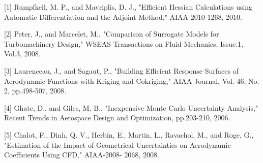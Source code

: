 \documentclass{report}
\begin{document}
[1] Rumpfkeil, M. P., and Mavriplis, D. J., "Efficient Hessian
Calculations using Automatic Differentiation and the Adjoint Method,"
AIAA-2010-1268, 2010.

[2] Peter, J., and Marcelet, M., "Comparison of Surrogate Models for
Turbomachinery Design," WSEAS Transactions on Fluid Mechanics, Issue.1,
Vol.3, 2008.

[3] Laurenceau, J., and Sagaut, P., "Building Efficient Response
Surfaces of Aerodynamic Functions with Kriging and Cokriging," AIAA
Journal, Vol. 46, No. 2, pp.498-507, 2008.

[4] Ghate, D., and Giles, M. B., "Inexpensive Monte Carlo Uncertainty
Analysis," Recent Trends in Aerospace Design and Optimization,
pp.203-210, 2006.

[5] Chalot, F., Dinh, Q. V., Herbin, E., Martin, L., Ravachol, M., and
Roge, G., "Estimation of the Impact of Geometrical Uncertainties on
Aerodynamic Coefficients Using CFD," AIAA-2008- 2068, 2008.
\end{document}

